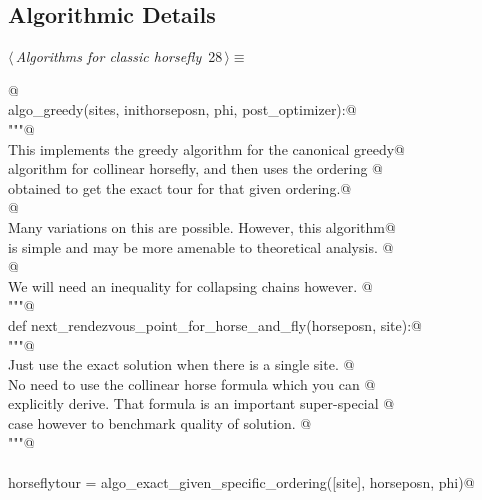 \documentclass[11.5pt]{report}
\begin{document}
\subsection{Algorithmic Details}
\begin{flushleft} \small\label{scrap23}\raggedright\small
{} $\langle\,${\itshape Algorithms for classic horsefly}\nobreak\ {\footnotesize {28}}$\,\rangle\equiv$
\vspace{-1ex}
\begin{list}{}{} \item
\mbox{}\verb@   @\\
\mbox{}\verb@def algo_greedy(sites, inithorseposn, phi, post_optimizer):@\\
\mbox{}\verb@      """@\\
\mbox{}\verb@      This implements the greedy algorithm for the canonical greedy@\\
\mbox{}\verb@      algorithm for collinear horsefly, and then uses the ordering @\\
\mbox{}\verb@      obtained to get the exact tour for that given ordering.@\\
\mbox{}\verb@      @\\
\mbox{}\verb@      Many variations on this are possible. However, this algorithm@\\
\mbox{}\verb@      is simple and may be more amenable to theoretical analysis. @\\
\mbox{}\verb@      @\\
\mbox{}\verb@      We will need an inequality for collapsing chains however. @\\
\mbox{}\verb@      """@\\
\mbox{}\verb@      def next_rendezvous_point_for_horse_and_fly(horseposn, site):@\\
\mbox{}\verb@            """@\\
\mbox{}\verb@            Just use the exact solution when there is a single site. @\\
\mbox{}\verb@            No need to use the collinear horse formula which you can @\\
\mbox{}\verb@            explicitly derive. That formula is  an important super-special @\\
\mbox{}\verb@            case however to benchmark quality of solution. @\\
\mbox{}\verb@            """@\\
\mbox{}\verb@@\\
\mbox{}\verb@            horseflytour = algo_exact_given_specific_ordering([site], horseposn, phi)@\\

\end{list}
\end{flushleft}
\end{document}
